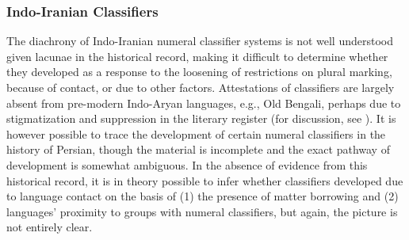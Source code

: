 \documentclass[11pt]{article}
\begin{document}
\subsubsection{Indo-Iranian Classifiers}
The diachrony of Indo-Iranian numeral classifier systems is not well understood given lacunae in the historical record, making it difficult to determine whether they developed as a response to the loosening of restrictions on plural marking, because of contact, or due to other factors. 
Attestations of classifiers are largely absent from pre-modern Indo-Aryan languages, e.g., Old Bengali, perhaps due to stigmatization and suppression in the literary register (for discussion, see \citealt[168]{BarzDiller1985}). 
It is however possible to trace the development of certain numeral classifiers in the history of Persian, though the material is incomplete and the exact pathway of development is somewhat ambiguous. 
In the absence of evidence from this historical record, it is in theory possible to infer whether classifiers developed due to language contact on the basis of (1) the presence of matter borrowing and (2) languages' proximity to groups with numeral classifiers, but again, the picture is not entirely clear. 
\end{document}
